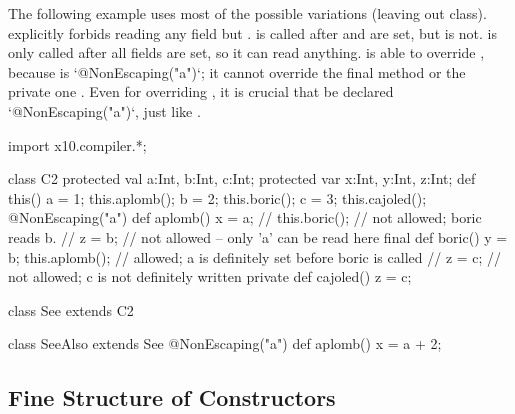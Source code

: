 The following example uses most of the possible variations (leaving out
 class).   explicitly forbids reading any field but
.  is called after  and  are set, but
 is not.  is only called after all fields are set, so it
can read anything.    is able to override , because
 is \xcd`@NonEscaping("a")`; it cannot override the final method
 or the private one .  Even for overriding
, it is crucial that  be 
declared \xcd`@NonEscaping("a")`, just like .
\begin{xten}
import x10.compiler.*;

class C2 {
  protected val a:Int, b:Int, c:Int;
  protected var x:Int, y:Int, z:Int;
  def this() {
    a = 1;
    this.aplomb();
    b = 2;
    this.boric();
    c = 3;
    this.cajoled();
  }
  @NonEscaping("a") def aplomb() {
    x = a;
    // this.boric(); // not allowed; boric reads b.
    // z = b; // not allowed -- only 'a' can be read here
  }
  final def boric() {
    y = b;
    this.aplomb(); // allowed; a is definitely set before boric is called
    // z = c; // not allowed; c is not definitely written 
  }
  private def cajoled() {
    z = c;
  }  
}

class See extends C2 {}

class SeeAlso extends See { 
  @NonEscaping("a") def aplomb() {
    x = a + 2;
  }
}

\end{xten}
%



\subsection{Fine Structure of Constructors}
\label{SFineStructCtors}

